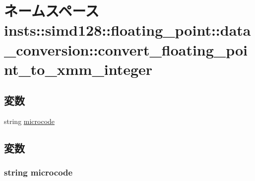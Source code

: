 \hypertarget{namespaceinsts_1_1simd128_1_1floating__point_1_1data__conversion_1_1convert__floating__point__to__xmm__integer}{
\section{ネームスペース insts::simd128::floating\_\-point::data\_\-conversion::convert\_\-floating\_\-point\_\-to\_\-xmm\_\-integer}
\label{namespaceinsts_1_1simd128_1_1floating__point_1_1data__conversion_1_1convert__floating__point__to__xmm__integer}
}
\subsection*{変数}
\begin{DoxyCompactItemize}
\item 
string \hyperlink{namespaceinsts_1_1simd128_1_1floating__point_1_1data__conversion_1_1convert__floating__point__to__xmm__integer_a770f11a173e99389a8802f0107ed8f52}{microcode}
\end{DoxyCompactItemize}


\subsection{変数}
\hypertarget{namespaceinsts_1_1simd128_1_1floating__point_1_1data__conversion_1_1convert__floating__point__to__xmm__integer_a770f11a173e99389a8802f0107ed8f52}{
\subsubsection[{microcode}]{\setlength{\rightskip}{0pt plus 5cm}string {\bf microcode}}}
\label{namespaceinsts_1_1simd128_1_1floating__point_1_1data__conversion_1_1convert__floating__point__to__xmm__integer_a770f11a173e99389a8802f0107ed8f52}
